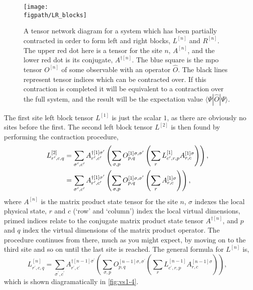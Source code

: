 \begin{figure}[ht!]
\centering
\texttt{[image: \\figpath/LR\_blocks]}
\caption{A tensor network diagram for a system which has been partially contracted in order to form left and right blocks, \(L^{[n]}\) and \(R^{[n]}\). The upper red dot here is a tensor for the site \(n\), \(A^{[n]}\), and the lower red dot is its conjugate, \(A^{\dagger [n]}\). The blue square is the mpo tensor \(O^{[n]}\) of some observable with an operator \(\hat{O}\). The black lines represent tensor indices which can be contracted over. If this contraction is completed it will be equivalent to a contraction over the full system, and the result will be the expectation value \(\langle \Psi | \hat{O} | \Psi \rangle \).}
\label{fig:vs1-2}
\end{figure}

The first site left block tensor \(L^{[1]}\) is just the scalar \(1\), as there are obviously no sites before the first. The second left block tensor \(L^{[2]}\) is then found by performing the contraction procedure,
\begin{align}
L^{[2]}_{r^{\prime}, c, q} &= \sum_{\sigma^{\prime}, c^{\prime}} A^{\dagger [1] \sigma^{\prime}}_{r^{\prime}, c^{\prime}} \left( \sum_{\sigma, p} O^{[1]  \sigma, \sigma^{\prime}}_{p, q} \left( \sum_{r} L^{[1]}_{c^{\prime}, r, p} A^{[1] \sigma}_{r, c} \right) \right), \notag \\
&= \sum_{\sigma^{\prime}, c^{\prime}} A^{\dagger [1] \sigma^{\prime}}_{r^{\prime}, c^{\prime}} \left( \sum_{\sigma, p} O^{[1]  \sigma, \sigma^{\prime}}_{p, q} \left( \sum_{r} A^{[1] \sigma}_{r, c} \right) \right),
\label{eq:vs1-3}
\end{align}
where \(A^{[n]}\) is the matrix product state tensor for the site \(n\), \(\sigma\) indexes the local physical state, \(r\) and \(c\) (`row' and `column') index the local virtual dimensions, primed indices relate to the conjugate matrix product state tensor \(A^{\dagger [n]}\), and \(p\) and \(q\) index the virtual dimensions of the matrix product operator. The procedure continues from there, much as you might expect, by moving on to the third site and so on until the last site is reached. The general formula for \(L^{[n]}\) is,
\begin{equation} 
L^{[n]}_{r^{\prime}, c, q} = \sum_{\sigma^{\prime}, c^{\prime}} A^{\dagger [n-1] \sigma^{\prime}}_{r^{\prime}, c^{\prime}} \left( \sum_{\sigma, p} O^{[n-1]  \sigma, \sigma^{\prime}}_{p, q} \left( \sum_{r} L^{[n-1]}_{c^{\prime}, r, p} A^{[n-1] \sigma}_{r, c} \right) \right),
\label{eq:vs1-4}
\end{equation}
which is shown diagramatically in \cref{fig:vs1-4}.

